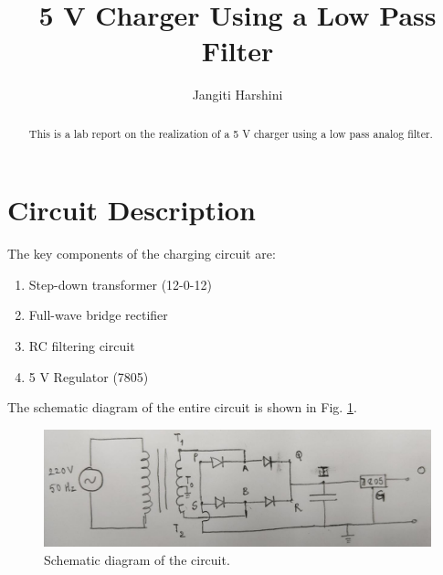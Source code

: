 \documentclass[journal,12pt,twocolumn]{IEEEtran}
\begin{document}
\let\StandardTheFigure\thefigure
\renewcommand{\thefigure}{\arabic{section}.\arabic{figure}}
\makeatletter
{}
\makeatother


\def\putbox#1#2#3{\makebox[0in][l]{\makebox[#1][l]{}\raisebox{\baselineskip}[0in][0in]{\raisebox{#2}[0in][0in]{#3}}}}
     \def\rightbox#1{\makebox[0in][r]{#1}}
     \def\centbox#1{\makebox[0in]{#1}}
     \def\topbox#1{\raisebox{-\baselineskip}[0in][0in]{#1}}
     \def\midbox#1{\raisebox{-0.5\baselineskip}[0in][0in]{#1}}

\vspace{3cm}

\title{5 V Charger Using a Low Pass Filter}
\author{Jangiti Harshini}
\maketitle
\tableofcontents
\renewcommand{\thetable}{\theenumi}
\bigskip
\begin{abstract}
    This is a lab report on the realization of a 5 V charger using
    a low pass analog filter.
\end{abstract}
\section{Circuit Description}
The key components of the charging circuit are:
\begin{enumerate}
    \item Step-down transformer (12-0-12)
    \item Full-wave bridge rectifier
    \item RC filtering circuit
    \item 5 V Regulator (7805)
\end{enumerate}

The schematic diagram of the entire circuit is shown in Fig. \ref{fig:ckt}.
\begin{figure}[!htb]
    \includegraphics[width=\columnwidth]{figs/ckt.jpg}
    \caption{Schematic diagram of the circuit.}
    \label{fig:ckt}
\end{figure}
\end{document}
